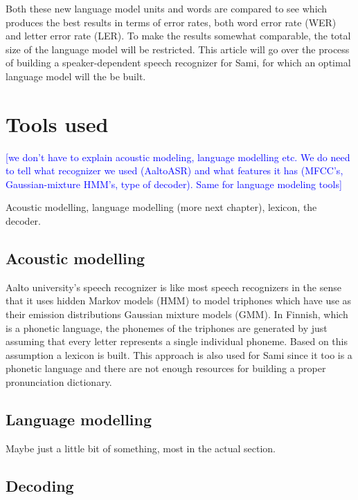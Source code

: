 \documentclass[10pt,b5paper]{article}
\newcommand{\note}[1]{{\textcolor{blue}{[#1]}}}
\begin{document}
Both these new language model units and words are compared to see which produces the best results in terms of error rates, both word error rate (WER) and letter error rate (LER). To make the results somewhat comparable, the total size of the language model will be restricted. This article will go over the process of building a speaker-dependent speech recognizer for Sami, for which an optimal language model will the be built.

\section{Tools used}

\note{we don't have to explain acoustic modeling, language modelling etc. We do need to tell what recognizer we used (AaltoASR) and what features it has (MFCC's, Gaussian-mixture HMM's, type of decoder). Same for language modeling tools}

Acoustic modelling, language modelling (more next chapter), lexicon, the decoder.



\subsection{Acoustic modelling}

Aalto university's speech recognizer is like most speech recognizers in the sense that it uses hidden Markov models (HMM) to model triphones which have use as their emission distributions Gaussian mixture models (GMM). In Finnish, which is a phonetic language, the phonemes of the triphones are generated by just assuming that every letter represents a single individual phoneme. Based on this assumption a lexicon is built. This approach is also used for Sami since it too is a phonetic language and there are not enough resources for building a proper pronunciation dictionary. 

\subsection{Language modelling}

Maybe just a little bit of something, most in the actual section.


\subsection{Decoding}
\end{document}
